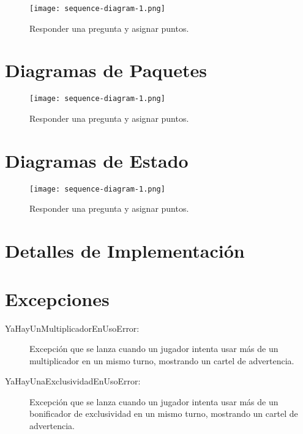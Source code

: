 \documentclass[titlepage,a4paper]{article}
\begin{document}
\begin{figure}[H]
\centering
\texttt{[image: sequence-diagram-1.png]}
\caption{\label{fig:seq01}Responder una pregunta y asignar puntos.}
\end{figure}


\section{Diagramas de Paquetes}\label{sec:diagramasdepaquetes}

\begin{figure}[H]
\centering
\texttt{[image: sequence-diagram-1.png]}
\caption{\label{fig:seq01}Responder una pregunta y asignar puntos.}
\end{figure}


\section{Diagramas de Estado}\label{sec:diagramasdeestado}

\begin{figure}[H]
\centering
\texttt{[image: sequence-diagram-1.png]}
\caption{\label{fig:seq01}Responder una pregunta y asignar puntos.}
\end{figure}


\section{Detalles de Implementación}\label{sec:detallesdeimplementacion}

\subsection{}


\section{Excepciones}\label{sec:excepciones}

\begin{description}
\item[YaHayUnMultiplicadorEnUsoError:] Excepción que se lanza cuando un jugador intenta usar más de un multiplicador en un mismo turno, mostrando un cartel de advertencia.

\end{description}

\begin{description}
\item[YaHayUnaExclusividadEnUsoError:] Excepción que se lanza cuando un jugador intenta usar más de un bonificador de exclusividad en un mismo turno, mostrando un cartel de advertencia.

\end{description}
\end{document}
